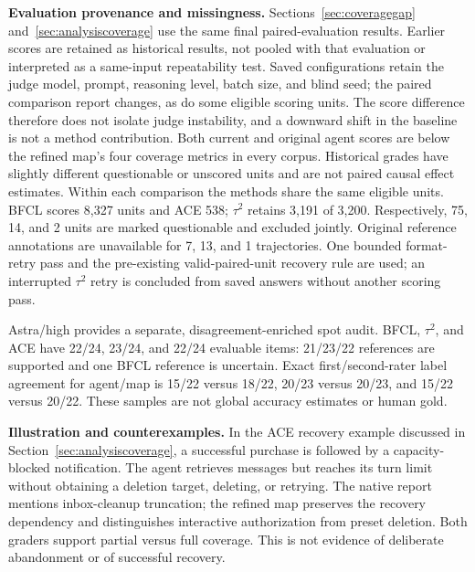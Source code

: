 \begin{table}[ht]
\centering\small
\setlength{\tabcolsep}{3.5pt}

\caption{Task / failure coverage (\%) and report lengths. ``Original'' and
``paired'' grade the same native report in different judging contexts, not
different native generations.}
\label{tab:analysiscoverage}
\end{table}

\begin{table}[ht]
\centering\small

\caption{Subset--family-balanced task / failure coverage (\%). Families are a
fixed diagnostic taxonomy, not an exhaustive ontology of benchmark failures.}
\end{table}

\textbf{Evaluation provenance and missingness.}\quad
Sections~\ref{sec:coveragegap} and~\ref{sec:analysiscoverage} use the same final
paired-evaluation results. Earlier scores are retained as historical results,
not pooled with that evaluation or interpreted as a same-input repeatability
test. Saved configurations retain the judge model, prompt, reasoning level,
batch size, and blind seed; the paired comparison report changes, as do some
eligible scoring units. The score difference therefore does not isolate judge
instability, and a downward shift in the baseline is not a method contribution.
Both current and original agent scores are below the refined map's four coverage
metrics in every corpus. Historical grades have slightly different questionable
or unscored units and are not paired causal effect estimates. Within each
comparison the methods share the same eligible units. BFCL scores 8,327 units
and ACE 538; $\tau^2$ retains 3,191 of 3,200. Respectively, 75, 14, and 2 units
are marked questionable and excluded jointly. Original reference annotations
are unavailable for 7, 13, and 1 trajectories. One bounded format-retry pass
and the pre-existing valid-paired-unit recovery rule are used; an interrupted
$\tau^2$ retry is concluded from saved answers without another scoring pass.

Astra/high provides a separate, disagreement-enriched spot audit. BFCL, $\tau^2$,
and ACE have 22/24, 23/24, and 22/24 evaluable items: 21/23/22 references are
supported and one BFCL reference is uncertain. Exact first/second-rater label
agreement for agent/map is 15/22 versus 18/22, 20/23 versus 20/23, and 15/22
versus 20/22. These samples are not global accuracy estimates or human gold.

\textbf{Illustration and counterexamples.}\quad
In the ACE recovery example discussed in Section~\ref{sec:analysiscoverage}, a successful purchase is followed by a capacity-blocked
notification. The agent retrieves messages but reaches its turn limit without
obtaining a deletion target, deleting, or retrying. The native report mentions
inbox-cleanup truncation; the refined map preserves the recovery dependency and
distinguishes interactive authorization from preset deletion. Both graders
support partial versus full coverage. This is not evidence of deliberate
abandonment or of successful recovery.

